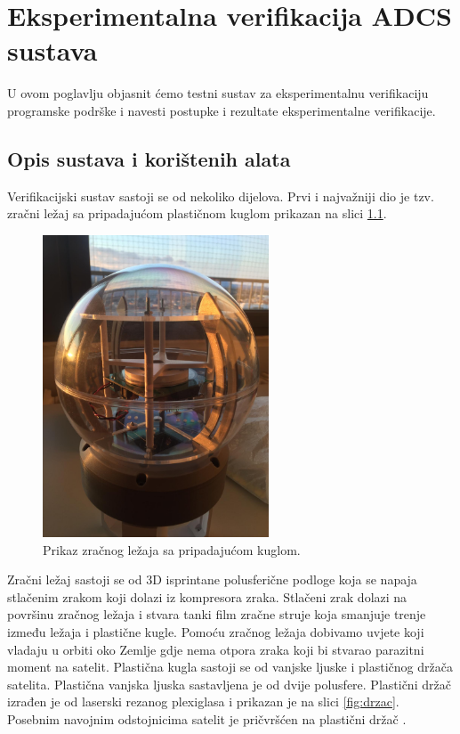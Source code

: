 \documentclass[times, utf8, diplomski, numeric]{templates/template}
\begin{document}
\chapter{Eksperimentalna verifikacija ADCS sustava}{
    U ovom poglavlju objasnit ćemo testni sustav za eksperimentalnu verifikaciju programske podrške i navesti postupke i rezultate eksperimentalne verifikacije. 

    \section{Opis sustava i korištenih alata}{
    \label{section:opis_sustava_i_koristenih_alata}
        Verifikacijski sustav sastoji se od nekoliko dijelova. Prvi i najvažniji dio je tzv. zračni ležaj sa pripadajućom plastičnom kuglom prikazan na slici \ref{fig:fotka_zracni}.

        \begin{figure}[htb]
        \centering
        \includegraphics[width=0.6\textwidth]{images/fotka_zracni.jpg}
        \caption{Prikaz zračnog ležaja sa pripadajućom kuglom.}
        \label{fig:fotka_zracni}
        \end{figure}

        Zračni ležaj sastoji se od 3D isprintane polusferične podloge koja se napaja stlačenim zrakom koji dolazi iz kompresora zraka. Stlačeni zrak dolazi na površinu zračnog ležaja i stvara tanki film zračne struje koja smanjuje trenje između ležaja i plastične kugle. Pomoću zračnog ležaja dobivamo uvjete koji vladaju u orbiti oko Zemlje gdje nema otpora zraka koji bi stvarao parazitni moment na satelit. Plastična kugla sastoji se od vanjske ljuske i plastičnog držača satelita. Plastična vanjska ljuska sastavljena je od dvije polusfere. Plastični držač izrađen je od laserski rezanog plexiglasa i prikazan je na slici \ref{fig:drzac}. Posebnim navojnim odstojnicima satelit je pričvršćen na plastični držač \cite{zracni_lezaj}.

}}
\end{document}
